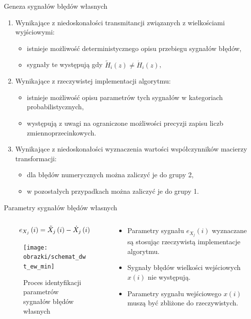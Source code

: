 \documentclass[12pt, polish, aspectratio = 169]{slides}
\begin{document}
\begin{frame}{Geneza sygnałów błędów własnych}
\begin{enumerate}
\item Wynikające z niedoskonałości transmitancji związanych z wielkościami wyjściowymi:
	\begin{itemize}
	\item istnieje możliwość deterministycznego opisu przebiegu sygnałów błędów,
	\item sygnały te występują gdy $\tilde{H}_{i}(z) \ne \dot{H}_{i}(z)$,
	\end{itemize}
\item Wynikające z rzeczywistej implementacji algorytmu:
	\begin{itemize}
	\item istnieje możliwość opisu parametrów tych sygnałów w kategoriach probabilistycznych,
	\item występują z uwagi na ograniczone możliwości precyzji zapisu liczb zmiennoprzecinkowych.
	\end{itemize}
\item Wynikające z niedoskonałości wyznaczenia wartości współczynników macierzy transformacji:
	\begin{itemize}
	\item dla błędów numerycznych można zaliczyć je do grupy 2,
	\item w pozostałych przypadkach można zaliczyć je do grupy 1.
	\end{itemize}
\end{enumerate}
\end{frame}

\begin{frame}{Parametry sygnałów błędów własnych}
\begin{columns}
\begin{column}{0.6\textwidth}
	\begin{equation}
	e_{X_{j}}\left(i\right) = \tilde{X}_{j}\left(i\right) - \dot{X}_{j}\left(i\right) \label{eq:dwt_round_error}
	\end{equation}
	\begin{figure}
	\texttt{[image: obrazki/schemat\_dwt\_ew\_min]}
	\caption{Proces identyfikacji parametrów sygnałów błędów własnych}
	\end{figure}
\end{column}
\begin{column}{0.4\textwidth}
	\begin{itemize}
	\item Parametry sygnału $e_{X_{j}}(i)$ wyznaczane są stosując rzeczywistą implementacje algorytmu.
	\item Sygnały błędów wielkości wejściowych $x(i)$ nie występują.
	\item Parametry sygnału wejściowego $x(i)$ muszą być zbliżone do rzeczywistych.
	\end{itemize}
\end{column}
\end{columns}
\end{frame}
\end{document}
